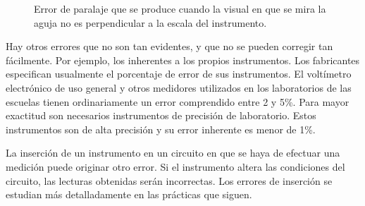 \documentclass[12pt]{article}
\begin{document}
\begin{figure}[h]
    \centering
    \caption{Error de paralaje que se produce cuando la visual en que se mira la aguja no es perpendicular a la escala del instrumento.}
    \label{fig:11-2}
\end{figure}

Hay otros errores que no son tan evidentes, y que no se pueden corregir tan fácilmente. Por ejemplo, los inherentes a los propios instrumentos. Los fabricantes especifican usualmente el porcentaje de error de sus instrumentos. El voltímetro electrónico de uso general y otros medidores utilizados en los laboratorios de las escuelas tienen ordinariamente un error comprendido entre 2 y 5\%. Para mayor exactitud son necesarios instrumentos de precisión de laboratorio. Estos instrumentos son de alta precisión y su error inherente es menor de 1\%.

La inserción de un instrumento en un circuito en que se haya de efectuar una medición puede originar otro error. Si el instrumento altera las condiciones del circuito, las lecturas obtenidas serán incorrectas. Los errores de inserción se estudian más detalladamente en las prácticas que siguen.
\end{document}
